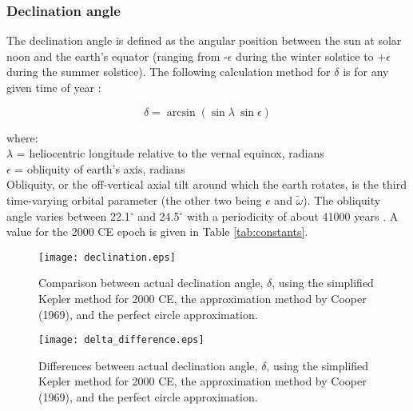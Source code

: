 \subsubsection{Declination angle}
\label{sec:delta}
The declination angle is defined as the angular position between the sun at solar noon and the earth's equator (ranging from -$\epsilon$ during the winter solstice to +$\epsilon$ during the summer solstice). 
The following calculation method for $\delta$ is for any given time of year \parencite{woolf68, loutre03}:

\begin{equation}
\label{eq:delta}
    \delta = \arcsin\left(\sin\lambda\:\sin\epsilon\right)
\end{equation}

\noindent where: \\
\indent $\lambda$ = heliocentric longitude relative to the vernal equinox, radians\\
\indent $\epsilon$ = obliquity of earth's axis, radians\\

Obliquity, or the off-vertical axial tilt around which the earth rotates, is the third time-varying orbital parameter (the other two being $e$ and $\tilde{\omega}$).  
The obliquity angle varies between 22.1$^{\circ}$ and 24.5$^{\circ}$ with a periodicity of about 41000 years \parencite{hays76,berger77}. 
A value for the 2000 CE epoch is given in Table \ref{tab:constants}.

\begin{figure}[ht!]
    \texttt{[image: declination.eps]}
    \caption{Comparison between actual declination angle, $\delta$, using the simplified Kepler method for 2000 CE, the approximation method by Cooper (1969), and the perfect circle approximation.}
    \label{fig:delta}
\end{figure}

\begin{figure}[ht!]
    \texttt{[image: delta\_difference.eps]}
    \caption{Differences between actual declination angle, $\delta$, using the simplified Kepler method for 2000 CE, the approximation method by Cooper (1969), and the perfect circle approximation.}
    \label{fig:ddiff}
\end{figure}

